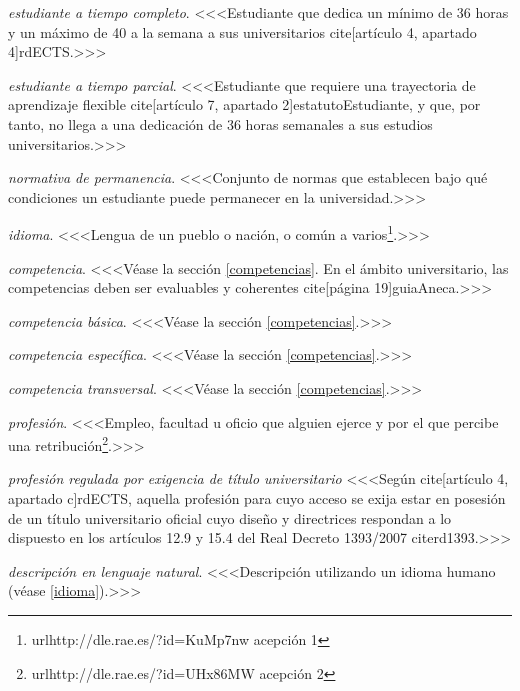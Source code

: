     \item \emph{estudiante a tiempo completo}. <<<Estudiante que dedica un mínimo de 36 horas y un máximo de 40 a la semana a sus universitarios cite[artículo 4, apartado 4]{rdECTS}.>>>

    \item \emph{estudiante a tiempo parcial}. <<<Estudiante que requiere una trayectoria de aprendizaje flexible cite[artículo 7, apartado 2]{estatutoEstudiante}, y que, por tanto, no llega a una dedicación de 36 horas semanales a sus estudios universitarios.>>>

    \item \emph{normativa de permanencia}. <<<Conjunto de normas que establecen bajo qué condiciones un estudiante puede permanecer en la universidad.>>>

    \item \emph{idioma}. <<<Lengua de un pueblo o nación, o común a varios\footnote{url{http://dle.rae.es/?id=KuMp7nw} acepción 1}.>>>

    \item \emph{competencia}. <<<Véase la sección \ref{competencias}.  En el ámbito universitario, las competencias deben ser evaluables y coherentes cite[página 19]{guiaAneca}.>>>

    \item \emph{competencia básica}. <<<Véase la sección \ref{competencias}.>>>

    \item \emph{competencia específica}. <<<Véase la sección \ref{competencias}.>>>

    \item \emph{competencia transversal}. <<<Véase la sección \ref{competencias}.>>>

    \item \emph{profesión}. <<<Empleo, facultad u oficio que alguien ejerce y por el que percibe una retribución\footnote{url{http://dle.rae.es/?id=UHx86MW} acepción 2}.>>>

    \item \emph{profesión regulada por exigencia de título universitario} <<<Según cite[artículo 4, apartado c]{rdECTS}, aquella profesión para cuyo acceso se exija estar en posesión de un título universitario oficial cuyo diseño y directrices respondan a lo dispuesto en los artículos 12.9 y 15.4 del Real Decreto 1393/2007 cite{rd1393}.>>>

    \item \emph{descripción en lenguaje natural}. <<<Descripción utilizando un idioma humano (véase \ref{idioma}).>>>

